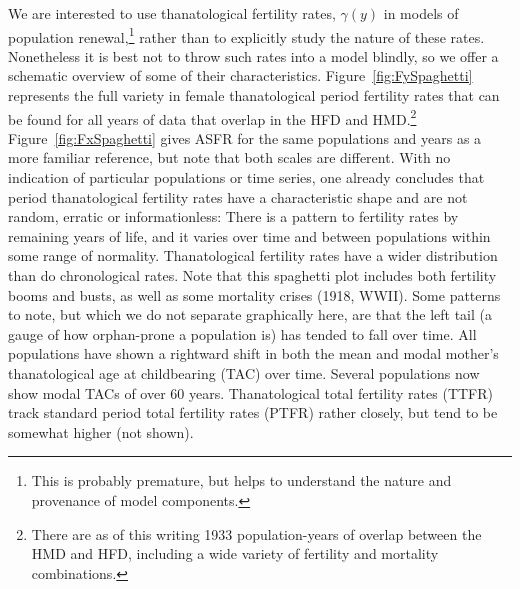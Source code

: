 \documentclass{article}
\begin{document}
We are interested to use thanatological fertility rates, $\gamma(y)$ in
models of population renewal,\footnote{This is probably premature, but helps to
understand the nature and provenance of model components.} rather than to
explicitly study the nature of these rates. Nonetheless it is best not to throw such rates into a model blindly, so we offer a schematic overview of some of their characteristics.
Figure~\ref{fig:FySpaghetti} represents the full variety in
female thanatological period fertility rates that can be found for all years
of data that overlap in the HFD and HMD.\footnote{There are as of this writing
1933 population-years of overlap between the HMD and HFD, including a wide
variety of fertility and mortality combinations.} Figure~\ref{fig:FxSpaghetti} gives ASFR for the same
populations and years as a more familiar reference, but note that both scales
are different. With no indication of particular populations or time series, one
already concludes that period thanatological fertility rates have a
characteristic shape and are not random, erratic or informationless: There is a
pattern to fertility rates by remaining years of life, and it varies over time
and between populations within some range of normality. Thanatological fertility
rates have a wider distribution than do chronological rates. Note that this
spaghetti plot includes both fertility booms and busts, as well as some
mortality crises (1918, WWII). Some patterns to note, but which we do not
separate graphically here, are that the left tail (a gauge of how orphan-prone a
population is) has tended to fall over time. All populations have shown a
rightward shift in both the mean and modal mother's thanatological age at
childbearing (TAC) over time. Several
populations now show modal TACs of over 60 years. Thanatological total fertility rates (TTFR)
track standard period total fertility rates (PTFR) rather closely, but tend to
be somewhat higher (not shown).
\end{document}
